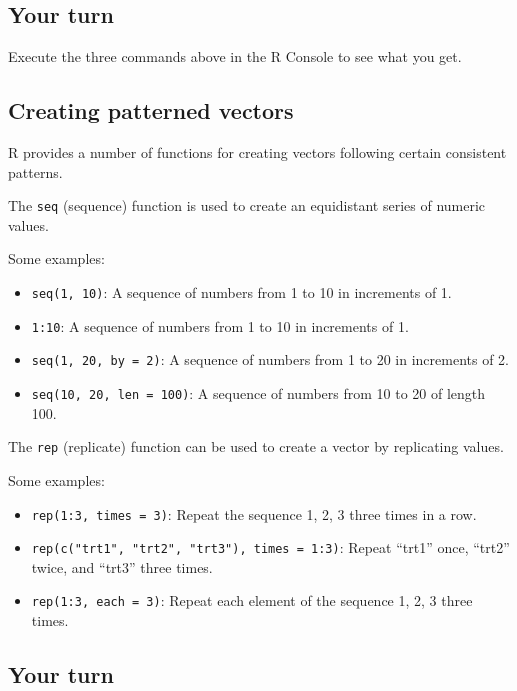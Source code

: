 \documentclass[
]{article}
\providecommand{\tightlist}{%
  \setlength{\itemsep}{0pt}\setlength{\parskip}{0pt}}
\begin{document}
\hypertarget{your-turn-6}{%
\subsection{Your turn}\label{your-turn-6}}

Execute the three commands above in the R Console to see what you get.

\hypertarget{creating-patterned-vectors}{%
\subsection{Creating patterned
vectors}\label{creating-patterned-vectors}}

R provides a number of functions for creating vectors following certain
consistent patterns.

The \texttt{seq} (sequence) function is used to create an equidistant
series of numeric values.

Some examples:

\begin{itemize}
\tightlist
\item
  \texttt{seq(1,\ 10)}: A sequence of numbers from 1 to 10 in increments
  of 1.
\item
  \texttt{1:10}: A sequence of numbers from 1 to 10 in increments of 1.
\item
  \texttt{seq(1,\ 20,\ by\ =\ 2)}: A sequence of numbers from 1 to 20 in
  increments of 2.
\item
  \texttt{seq(10,\ 20,\ len\ =\ 100)}: A sequence of numbers from 10 to
  20 of length 100.
\end{itemize}

The \texttt{rep} (replicate) function can be used to create a vector by
replicating values.

Some examples:

\begin{itemize}
\tightlist
\item
  \texttt{rep(1:3,\ times\ =\ 3)}: Repeat the sequence 1, 2, 3 three
  times in a row.
\item
  \texttt{rep(c("trt1",\ "trt2",\ "trt3"),\ times\ =\ 1:3)}: Repeat
  ``trt1'' once, ``trt2'' twice, and ``trt3'' three times.
\item
  \texttt{rep(1:3,\ each\ =\ 3)}: Repeat each element of the sequence 1,
  2, 3 three times.
\end{itemize}

\hypertarget{your-turn-7}{%
\subsection{Your turn}\label{your-turn-7}}
\end{document}
